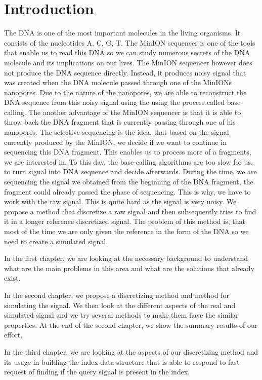 \chapter*{Introduction} %

The DNA is one of the most important molecules in the living organisms. It consists
of the nucleotides A, C, G, T. The MinION sequencer is one of the tools that enable
us to read this DNA so we can study numerous secrets of the DNA molecule and its
implications on our lives. The MinION sequencer however does not produce the DNA
sequence directly. Instead, it produces noisy signal that was created when the DNA
molecule passed through one of the MinIONs nanopores. Due to the nature of the
nanopores, we are able to reconstruct the DNA sequence from this noisy signal
using the using the process called base-calling. The another advantage of the MinION
sequencer is that it is able to throw back the DNA fragment that is currently passing
through one of his nanopores. The selective sequencing is the idea, that based on the
signal currently produced by the MinION, we decide if we want to continue in sequencing
this DNA fragment. This enables us to process more of a fragments, we are interested in.
To this day, the base-calling algorithms are too slow for us, to turn signal into DNA
sequence and decide afterwards. During the time, we are sequencing the signal we obtained
from the beginning of the DNA fragment, the fragment could already passed the phase of
sequencing. This is why, we have to work with the raw signal. This is quite hard as the
signal is very noisy. We propose a method that discretize a raw signal and then subsequently
tries to find it in a longer reference discretized signal. The problem of this method is, that
most of the time we are only given the reference in the form of the DNA so we need to create a simulated signal.

In the first chapter, we are looking at the necessary background to understand what
are the main problems in this area and what are the solutions that already exist.

In the second chapter, we propose a discretizing method and method for simulating the signal.
We then look at the different aspects of the real and simulated signal and we try several
methods to make them have the similar properties. At the end of the second chapter,
we show the summary results of our effort.

In the third chapter, we are looking at the aspects of our discretizing method and
its usage in building the index data structure that is able to respond to fast
request of finding if the query signal is present in the index.

